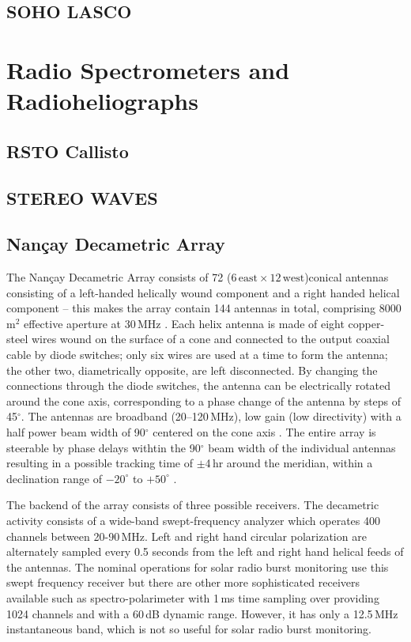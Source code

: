 \clearpage
\subsection{SOHO LASCO}\label{sec:23}




\section{Radio Spectrometers and Radioheliographs}\label{sec:3}

\subsection{RSTO Callisto}\label{sec:30}

\subsection{STEREO WAVES}\label{sec:31}

\subsection{Nan\c{c}ay Decametric Array}\label{sec:32}

The Nan\c{c}ay Decametric Array consists of 72 ($6\,\mathrm{east} \times12\,\mathrm{west}$)conical antennas consisting of a left-handed helically wound component and a right handed helical component -- this makes the array contain 144 antennas in total, comprising 8000\,m$^2$ effective aperture at 30\,MHz \citep{lecacheux2000}. Each helix antenna is made of eight copper-steel wires wound on the surface of a cone and connected to the output coaxial cable by diode switches; only six wires are used at a time to form the antenna; the other two, diametrically opposite, are left disconnected. By changing the connections through the diode switches, the antenna can be electrically rotated around the cone axis, corresponding to a phase change of the antenna by steps of 45$^{\circ}$. The antennas are broadband (20--120\,MHz), low gain (low directivity) with a half power beam width of 90$^{\circ}$ centered on the cone axis \citep{boischot1980}. The entire array is steerable by phase delays withtin the 90$^{\circ}$  beam width of the individual antennas resulting in a possible tracking time of $\pm$4\,hr around the meridian, within a declination range of $-20^{\circ}$ to $+50^{\circ}$ .

The backend of the array consists of three possible receivers. The decametric activity consists of a wide-band swept-frequency analyzer which operates 400 channels between 20-90\,MHz. Left and right hand circular polarization are alternately sampled every 0.5 seconds from the left and right hand helical feeds of the antennas. The nominal operations for solar radio burst monitoring use this swept frequency receiver but there are other more sophisticated receivers available such as spectro-polarimeter with 1\,ms time sampling over providing 1024 channels and with a 60\,dB dynamic range. However, it has only a 12.5\,MHz instantaneous band, which is not so useful for solar radio burst monitoring.

